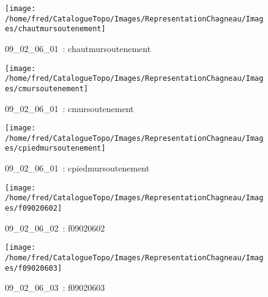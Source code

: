\documentclass[12pt,titlepage]{book}
\begin{document}
\begin{figure}[h!]
  \hfill         %
  \begin{minipage}[t]{3cm}
    \begin{center}
      \texttt{[image: /home/fred/CatalogueTopo/Images/RepresentationChagneau/Images/chautmursoutenement]}
      \caption[~09\_02\_06\_01]{\small{09\_02\_06\_01~:} \tiny{chautmursoutenement}}\label{chautmursoutenement}
    \end{center}
  \end{minipage}
  \begin{minipage}[t]{3cm}
    \begin{center}
      \texttt{[image: /home/fred/CatalogueTopo/Images/RepresentationChagneau/Images/cmursoutenement]}
      \caption[~09\_02\_06\_01]{\small{09\_02\_06\_01~:} \tiny{cmursoutenement}}\label{cmursoutenement}
    \end{center}
  \end{minipage}
  \begin{minipage}[t]{3cm}
    \begin{center}
      \texttt{[image: /home/fred/CatalogueTopo/Images/RepresentationChagneau/Images/cpiedmursoutenement]}
      \caption[~09\_02\_06\_01]{\small{09\_02\_06\_01~:} \tiny{cpiedmursoutenement}}\label{cpiedmursoutenement}
    \end{center}
  \end{minipage}
  \begin{minipage}[t]{3cm}
    \begin{center}
      \texttt{[image: /home/fred/CatalogueTopo/Images/RepresentationChagneau/Images/f09020602]}
      \caption[~09\_02\_06\_02]{\small{09\_02\_06\_02~:} \tiny{f09020602}}\label{f09020602}
    \end{center}
  \end{minipage}
  \begin{minipage}[t]{3cm}
    \begin{center}
      \texttt{[image: /home/fred/CatalogueTopo/Images/RepresentationChagneau/Images/f09020603]}
      \caption[~09\_02\_06\_03]{\small{09\_02\_06\_03~:} \tiny{f09020603}}\label{f09020603}
    \end{center}
  \end{minipage}
\end{figure}
\end{document}
